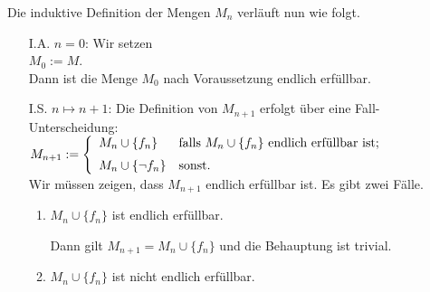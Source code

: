 Die induktive Definition der Mengen $M_n$ verläuft nun wie folgt.
\begin{enumerate}
\item[I.A.] $n = 0$:  Wir setzen
  \\[0.2cm]
  \hspace*{1.3cm}
  $M_0 := M$.
  \\[0.2cm]
  Dann ist die Menge $M_0$ nach Voraussetzung endlich erfüllbar.
\item[I.S.] $n \mapsto n + 1$:  Die Definition von $M_{n+1}$ erfolgt über eine Fall-Unterscheidung:
  \\[0.2cm]
  \hspace*{1.3cm}
  $M_{n+1} := \left\{
  \begin{array}[c]{ll}
    M_n \cup \{ f_n \}      & \mbox{falls $M_n \cup \{ f_n \}$ endlich erfüllbar ist;} \\[0.2cm]
    M_n \cup \{ \neg f_n \} & \mbox{sonst.}
  \end{array}
  \right.
  $
  \\[0.2cm]
  Wir müssen zeigen, dass $M_{n+1}$ endlich erfüllbar ist.  Es gibt zwei Fälle.
  \begin{enumerate}
  \item $M_n \cup \{ f_n \}$ ist endlich erfüllbar.

        Dann gilt $M_{n+1} = M_n \cup \{ f_n \}$ und die Behauptung ist trivial.
  \item $M_n \cup \{ f_n \}$ ist nicht endlich erfüllbar.


\end{enumerate}
\end{enumerate}
